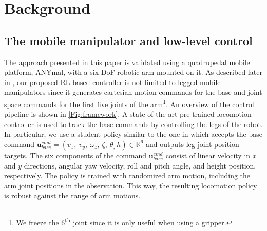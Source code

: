\section{Background}
\label{sec:background}

\subsection{The mobile manipulator and low-level control}
\label{subsec:robot_locomotion}
%
The approach presented in this paper is validated using a quadrupedal mobile platform, ANYmal, with a six DoF robotic arm mounted on it. As described later in , our proposed RL-based controller is not limited to legged mobile manipulators since it generates cartesian motion commands for the base and joint space commands for the first five joints of the arm\footnote{We freeze the 6\textsuperscript{th} joint since it is only useful when using a gripper.}. An overview of the control pipeline is shown in \cref{Fig:framework}. A state-of-the-art pre-trained locomotion controller is used to track the base commands by controlling the legs of the robot. In particular, we use a student policy similar to the one in \cite{miki2024learningwalkconfinedspaces} which accepts the base command $\pmb u_{base}^{cmd} = (v_x, \ v_y, \ \omega_z, \ \zeta, \ \theta_, \ h) \in \mathbb{R}^6$ and outputs leg joint position targets. The six components of the command $\pmb u_{base}^{cmd}$ consist of linear velocity in $x$ and $y$ directions, angular yaw velocity, roll and pitch angle, and height position, respectively. The policy is trained with randomized arm motion, including the arm joint positions in the observation. This way, the resulting locomotion policy is robust against the range of arm motions.